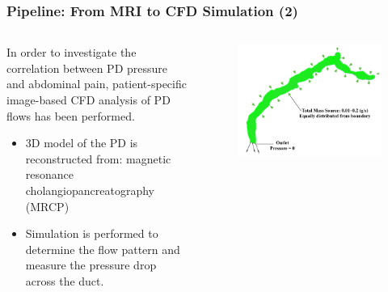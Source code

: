 \documentclass{beamer}
\begin{document}
\begin{frame}
    \fontsize{8pt}{10pt}\selectfont
    \frametitle{Pipeline: From MRI to CFD Simulation (2) }
    \vspace{0.02\textwidth}

    \begin{columns}
        \begin{column}{0.6\textwidth}
            In order to investigate the correlation between PD pressure and abdominal pain, 
            patient-specific image-based CFD analysis of PD flows has been performed.
            
            \vspace{0.02\textwidth}


            \begin{itemize}
                \item   3D model of the PD is reconstructed from: magnetic resonance cholangiopancreatography (MRCP)
                \item Simulation is performed to determine the flow pattern and measure the pressure drop across the duct.
            \end{itemize}

            
            
        \end{column}

        \begin{column}{0.45\textwidth}

            \begin{figure}[H]
                \centering
                \includegraphics[width=\textwidth]{figures/PD_BC.jpg}
            \end{figure}
        \end{column}
    \end{columns}


\end{frame}
\end{document}
